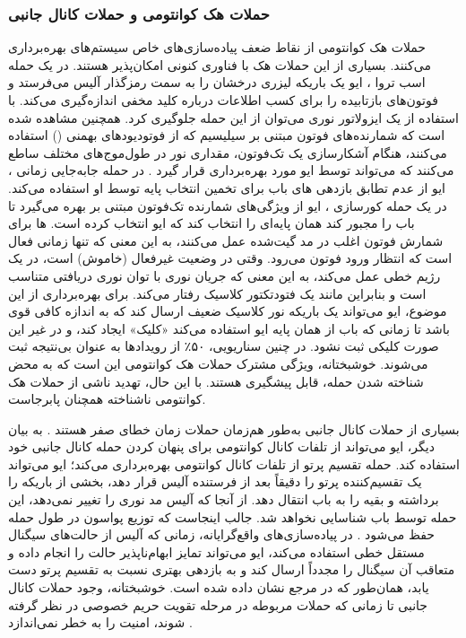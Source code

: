 \subsubsection{حملات هک کوانتومی و حملات کانال جانبی}
\label{subsec:6-5-3}
حملات هک کوانتومی از نقاط ضعف پیاده‌سازی‌های خاص سیستم‌های  بهره‌برداری می‌کنند. بسیاری از این حملات هک با فناوری کنونی امکان‌پذیر هستند. در یک حمله اسب تروا \cite{54}، ایو یک باریکه لیزری درخشان را به سمت رمزگذار آلیس می‌فرستد و فوتون‌های بازتابیده را برای کسب اطلاعات درباره کلید مخفی اندازه‌گیری می‌کند. با استفاده از یک ایزولاتور نوری می‌توان از این حمله جلوگیری کرد. همچنین مشاهده شده است که شمارنده‌های فوتون مبتنی بر سیلیسیم که از فوتودیودهای بهمنی () استفاده می‌کنند، هنگام آشکارسازی یک تک‌فوتون، مقداری نور در طول‌موج‌های مختلف ساطع می‌کنند که می‌تواند توسط ایو مورد بهره‌برداری قرار گیرد \cite{55}. در حمله جابه‌جایی زمانی \cite{56}، ایو از عدم تطابق بازدهی های باب برای تخمین انتخاب پایه توسط او استفاده می‌کند. در یک حمله کورسازی \cite{57}، ایو از ویژگی‌های شمارنده تک‌فوتون مبتنی بر  بهره می‌گیرد تا باب را مجبور کند همان پایه‌ای را انتخاب کند که ایو انتخاب کرده است. ها برای شمارش فوتون اغلب در مد گیت‌شده عمل می‌کنند، به این معنی که  تنها زمانی فعال است که انتظار ورود فوتون می‌رود. وقتی  در وضعیت غیرفعال (خاموش) است، در یک رژیم خطی عمل می‌کند، به این معنی که جریان نوری با توان نوری دریافتی متناسب است و بنابراین مانند یک فتودتکتور کلاسیک رفتار می‌کند. برای بهره‌برداری از این موضوع، ایو می‌تواند یک باریکه نور کلاسیک ضعیف ارسال کند که به اندازه کافی قوی باشد تا زمانی که باب از همان پایه ایو استفاده می‌کند «کلیک» ایجاد کند، و در غیر این صورت کلیکی ثبت نشود. در چنین سناریویی، ۵۰٪ از رویدادها به عنوان بی‌نتیجه ثبت می‌شوند. خوشبختانه، ویژگی مشترک حملات هک کوانتومی این است که به محض شناخته شدن حمله، قابل پیشگیری هستند. با این حال، تهدید ناشی از حملات هک کوانتومی ناشناخته همچنان پابرجاست.

بسیاری از حملات کانال جانبی به‌طور هم‌زمان حملات زمان خطای صفر هستند \cite{48}. به بیان دیگر، ایو می‌تواند از تلفات کانال کوانتومی برای پنهان کردن حمله کانال جانبی خود استفاده کند. حمله تقسیم پرتو از تلفات کانال کوانتومی بهره‌برداری می‌کند؛ ایو می‌تواند یک تقسیم‌کننده پرتو را دقیقاً بعد از فرستنده آلیس قرار دهد، بخشی از باریکه را برداشته و بقیه را به باب انتقال دهد. از آنجا که آلیس مد نوری را تغییر نمی‌دهد، این حمله توسط باب شناسایی نخواهد شد. جالب اینجاست که توزیع پواسون در طول حمله  حفظ می‌شود \cite{58}. در پیاده‌سازی‌های واقع‌گرایانه، زمانی که آلیس از حالت‌های سیگنال مستقل خطی استفاده می‌کند، ایو می‌تواند تمایز ابهام‌ناپذیر حالت را انجام داده و متعاقب آن سیگنال را مجدداً ارسال کند و به بازدهی بهتری نسبت به تقسیم پرتو دست یابد، همان‌طور که در مرجع \cite{59} نشان داده شده است. خوشبختانه، وجود حملات کانال جانبی تا زمانی که حملات مربوطه در مرحله تقویت حریم خصوصی در نظر گرفته شوند، امنیت را به خطر نمی‌اندازد \cite{48}.

